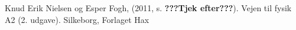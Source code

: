 \begin{thebibliography}{9}


 
  Knud Erik Nielsen og Esper Fogh,
  (2011, s. \textbf{???Tjek efter???}). 
  Vejen til fysik A2 (2. udgave). 
  Silkeborg,
  Forlaget Hax

  
  
\end{thebibliography}